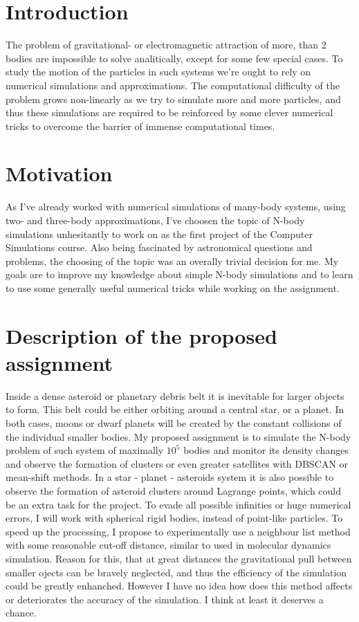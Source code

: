 \begin{abstract}
    \noindent 
\end{abstract}

\begin{multicols}{2}
\section{Introduction}
The problem of gravitational- or electromagnetic attraction of more, than 2 bodies are impossible to solve analitically, except for some few special cases. To study the motion of the particles in such systems we're ought to rely on numerical simulations and approximations. The computational difficulty of the problem grows non-linearly as we try to simulate more and more particles, and thus these simulations are required to be reinforced by some clever numerical tricks to overcome the barrier of immense computational times.

\section{Motivation}
As I've already worked with numerical simulations of many-body systems, using two- and three-body approximations, I've choosen the topic of N-body simulations unhesitantly to work on as the first project of the Computer Simulations course. Also being fascinated by astronomical questions and problems, the choosing of the topic was an overally trivial decision for me. My goals are to improve my knowledge about simple N-body simulations and to learn to use some generally useful numerical tricks while working on the assignment.

\section{Description of the proposed assignment}
Inside a dense asteroid or planetary debris belt it is inevitable for larger objects to form. This belt could be either orbiting around a central star, or a planet. In both cases, moons or dwarf planets will be created by the constant collisions of the individual smaller bodies. My proposed assignment is to simulate the N-body problem of such system of maximally $10^5$ bodies and monitor its density changes and observe the formation of clusters or even greater satellites with DBSCAN or mean-shift methods. In a star - planet - asteroids system it is also possible to observe the formation of asteroid clusters around Lagrange points, which could be an extra task for the project. \newline
To evade all possible infinities or huge numerical errors, I will work with spherical rigid bodies, instead of point-like particles. To speed up the processing, I propose to experimentally use a neighbour list method with some reasonable cut-off distance, similar to used in molecular dynamics simulation. Reason for this, that at great distances the gravitational pull between smaller ojects can be bravely neglected, and thus the efficiency of the simulation could be greatly enhanched. However I have no idea how does this method affects or deteriorates the accuracy of the simulation. I think at least it deserves a chance.


\end{multicols}
